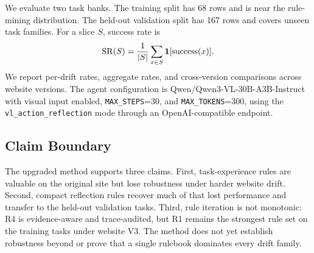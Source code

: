 We evaluate two task banks. The training split has 68 rows and is near the rule-mining distribution. The held-out validation split has 167 rows and covers unseen task families. For a slice \(S\), success rate is
\[
\mathrm{SR}(S)=\frac{1}{|S|}\sum_{x \in S}\mathbf{1}[\mathrm{success}(x)].
\]
We report per-drift rates, aggregate rates, and cross-version comparisons across website versions. The agent configuration is Qwen/Qwen3-VL-30B-A3B-Instruct with visual input enabled, \texttt{MAX\_STEPS}=30, and \texttt{MAX\_TOKENS}=300, using the \texttt{vl\_action\_reflection} mode through an OpenAI-compatible endpoint.

\subsection{Claim Boundary}

The upgraded method supports three claims. First, \expel{} task-experience rules are valuable on the original site but lose robustness under harder website drift. Second, compact reflection rules recover much of that lost performance and transfer to the held-out validation tasks. Third, rule iteration is not monotonic: R4 is evidence-aware and trace-audited, but R1 remains the strongest rule set on the training tasks under website V3. The method does not yet establish robustness beyond \linkding{} or prove that a single rulebook dominates every drift family.
